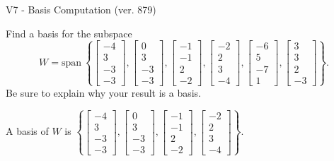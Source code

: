 \begin{exercise}
  \begin{exerciseTitle}V7 - Basis Computation (ver. 879)\end{exerciseTitle}
  \begin{exerciseStatement}
    Find a basis for the subspace 
\[W=\mathrm{span}\ \left\{\left[\begin{array}{r}
-4 \\
3 \\
-3 \\
-3
\end{array}\right] , \left[\begin{array}{r}
0 \\
3 \\
-3 \\
-3
\end{array}\right] , \left[\begin{array}{r}
-1 \\
-1 \\
2 \\
-2
\end{array}\right] , \left[\begin{array}{r}
-2 \\
2 \\
3 \\
-4
\end{array}\right] , \left[\begin{array}{r}
-6 \\
5 \\
-7 \\
1
\end{array}\right] , \left[\begin{array}{r}
3 \\
3 \\
2 \\
-3
\end{array}\right]\right\}.\]
 Be sure to explain why your result is a basis.


  \end{exerciseStatement}
  \begin{exerciseAnswer}
   A basis of \(W\) is  \(\left\{\left[\begin{array}{r}
-4 \\
3 \\
-3 \\
-3
\end{array}\right] , \left[\begin{array}{r}
0 \\
3 \\
-3 \\
-3
\end{array}\right] , \left[\begin{array}{r}
-1 \\
-1 \\
2 \\
-2
\end{array}\right] , \left[\begin{array}{r}
-2 \\
2 \\
3 \\
-4
\end{array}\right]\right\}\).
  


  \end{exerciseAnswer}
\end{exercise}